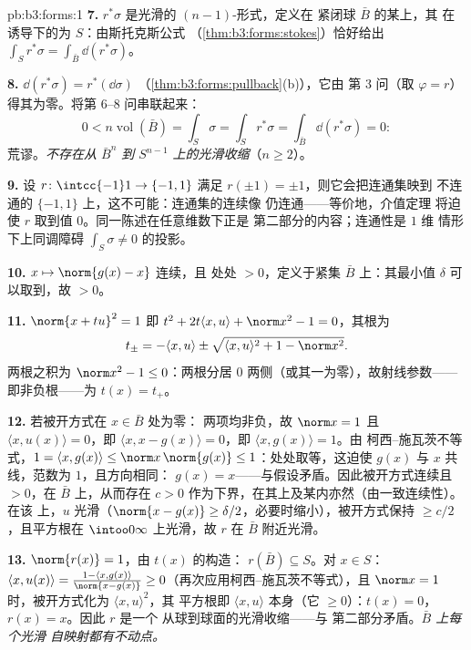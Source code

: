\begin{solution}{pb:b3:forms:1}
\textbf{7.} $r^*\sigma$ 是光滑的 $(n-1)$-形式，定义在
紧闭球 $\bar B$ 的某上，其
在诱导下的为 $S$：由斯托克斯公式
（\cref{thm:b3:forms:stokes}）恰好给出
$\int_Sr^*\sigma = \int_{\bar B}\dd(r^*\sigma)$。

\textbf{8.} $\dd(r^*\sigma) = r^*(\dd\sigma)$
（\cref{thm:b3:forms:pullback}(b)），它由
第 3 问（取 $\varphi = r$）得其为零。将第
6--8 问串联起来：
\[
0 < n\operatorname{vol}(\bar B) = \int_S\sigma =
\int_Sr^*\sigma = \int_{\bar B}\dd(r^*\sigma) = 0 :
\]
荒谬。\emph{不存在从 $\bar B^n$
到 $S^{n-1}$ 上的光滑收缩}（$n \geq 2$）。

\textbf{9.} 设 $r\colon\intcc{-1}1\to\{-1,1\}$
满足 $r(\pm1) = \pm1$，则它会把连通集映到
不连通的 $\{-1, 1\}$ 上，这不可能：连通集的连续像
仍连通——等价地，介值定理
将迫使 $r$ 取到值
$0$。同一陈述在任意维数下正是
第二部分的内容；连通性是 $1$ 维
情形下上同调障碍 $\int_S\sigma \neq 0$ 的投影。

\textbf{10.} $x \mapsto \norm{g(x) - x}$ 连续，且
处处 $> 0$，定义于紧集 $\bar B$ 上：其最小值
$\delta$ 可以取到，故 $> 0$。

\textbf{11.} $\norm{x + tu}^2 = 1$ 即 $t^2 + 2t\langle x,
u\rangle + \norm x^2 - 1 = 0$，其根为
\[
t_\pm = -\langle x, u\rangle \pm \sqrt{\langle x,
u\rangle^2 + 1 - \norm x^2} .
\]
两根之积为 $\norm x^2 - 1 \leq 0$：两根分居
$0$ 两侧（或其一为零），故射线参数——
即非负根——为 $t(x) = t_+$。

\textbf{12.} 若被开方式在 $x \in \bar B$ 处为零：
两项均非负，故 $\norm x = 1$ 且
$\langle x, u(x)\rangle = 0$，即 $\langle x, x -
g(x)\rangle = 0$，即 $\langle x, g(x)\rangle = 1$。由
柯西–施瓦茨不等式，$1 = \langle x, g(x)\rangle \leq
\norm x\,\norm{g(x)} \leq 1$：处处取等，这迫使
$g(x)$ 与 $x$ 共线，范数为 $1$，且方向相同：
$g(x) = x$——与假设矛盾。因此被开方式连续且
$> 0$，在 $\bar B$ 上，从而存在 $c > 0$
作为下界，在其上及某内亦然（由一致连续性）。在该
上，$u$ 光滑（$\norm{x - g(x)} \geq
\delta/2$，必要时缩小），被开方式保持 $\geq
c/2$，且平方根在 $\intoo0\infty$ 上光滑，故 $r$
在 $\bar B$ 附近光滑。

\textbf{13.} $\norm{r(x)} = 1$，由 $t(x)$ 的构造：
$r(\bar B) \subseteq S$。对 $x \in S$：$\langle x,
u(x)\rangle = \frac{1 - \langle x, g(x)\rangle}{\norm{x -
g(x)}} \geq 0$（再次应用柯西–施瓦茨不等式），且 $\norm x =
1$ 时，被开方式化为 $\langle x, u\rangle^2$，其
平方根即 $\langle x, u\rangle$ 本身（它 $\geq
0$）：$t(x) = 0$，$r(x) = x$。因此 $r$ 是一个
从球到球面的光滑收缩——与
第二部分矛盾。\emph{$\bar B$ 上每个光滑
自映射都有不动点。}


\end{solution}
